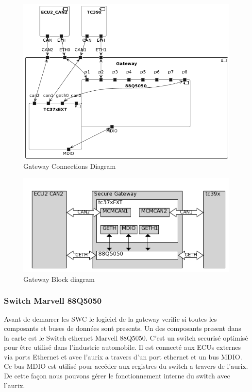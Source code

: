 \begin{figure}[!htb]
 \centering
 \includegraphics[width=\textwidth]{img/GWConnectionsDiagram.png}
 \caption{Gateway Connections Diagram}
 \label{fig:connections-diagram}
\end{figure}

\begin{figure}[!htb]
 \centering
 \includegraphics[width=\textwidth]{img/gateway_block_diagram.png}
 \caption{Gateway Block diagram}
 \label{fig:block diagram}
\end{figure}

\subsubsection{Switch Marvell 88Q5050}

Avant de demarrer les SWC le logiciel de la gateway verifie si toutes les composants et buses de donn\'ees sont presents. Un des composants present dans la carte est le Switch ethernet Marvell 88Q5050. C'est un switch securis\'e optimis\'e pour \^etre utilis\'e dans l'industrie automobile. Il est connect\'e aux ECUs externes via ports Ethernet et avec l'aurix a travers d'un port ethernet et un bus MDIO. Ce bus MDIO est utilis\'e pour accéder aux registres du switch a travers de l'aurix. De cette façon nous pouvons gérer le fonctionnement interne du switch avec l'aurix.

